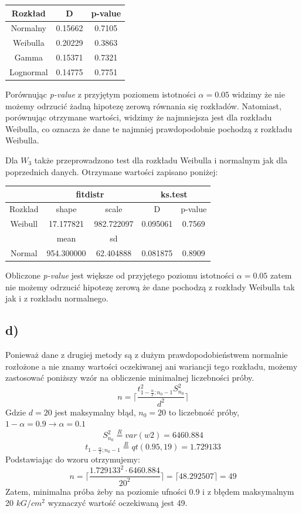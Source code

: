 \documentclass{article}
\begin{document}
\begin{center} \begin{tabular}{|c|c|c|} \hline
Rozkład & D & p-value \\ \hline
Normalny & 0.15662 & 0.7105 \\ \hline
Weibulla & 0.20229 & 0.3863 \\ \hline
Gamma & 0.15371 & 0.7321 \\ \hline
Lognormal & 0.14775 & 0.7751 \\ \hline
\end{tabular} \end{center}
Porównując \textit{p-value} z przyjętym poziomem istotności $\alpha = 0.05$ widzimy że nie możemy odrzucić żadną hipotezę zerową równania się rozkładów. Natomiast, porównując otrzymane wartości, widzimy że najmniejsza jest dla rozkładu Weibulla, co oznacza że dane te najmniej prawdopodobnie pochodzą z rozkładu Weibulla. \\ \par

Dla $W_3$ także przeprowadzono test dla rozkładu Weibulla i normalnym jak dla poprzednich danych. Otrzymane wartości zapisano poniżej:
\begin{center} \begin{tabular}{|c|c|c|c|c|} \hline
& \multicolumn{2}{|c|}{fitdistr} & \multicolumn{2}{|c|}{ks.test} \\ \hline
Rozklad & shape & scale & D & p-value \\ \hline
Weibull & 17.177821 & 982.722097 & 0.095061 & 0.7569 \\ \hline
& mean & sd & & \\ \hline
Normal & 954.300000 & 62.404888 & 0.081875 & 0.8909 \\ \hline
\end{tabular} \end{center}
Obliczone \textit{p-value} jest większe od przyjętego poziomu istotności $\alpha = 0.05$ zatem nie możemy odrzucić hipotezę zerową że dane pochodzą z rozkłady Weibulla tak jak i z rozkładu normalnego.

\subsection{d)}
Ponieważ dane z drugiej metody są z dużym prawdopodobieństwem normalnie rozłożone a nie znamy wartości oczekiwanej ani wariancji tego rozkładu, możemy zastosować poniższy wzór na obliczenie minimalnej liczebności próby.
\[ n = \Big \lceil \frac{t_{1 - \frac{\alpha}{2}; n_0 - 1}^2 S_{n_0}^2}{d^2} \Big \rceil \]
Gdzie $d = 20$ jest maksymalny błąd, $n_0 = 20$ to liczebność próby, $1 - \alpha = 0.9 \rightarrow \alpha = 0.1$
\[ S_{n_0}^2 \overset{R}{=} var(w2) = 6460.884 \]
\[ t_{1 - \frac{\alpha}{2}; n_0 - 1} \overset{R}{=} qt(0.95, 19) = 1.729133 \]
Podstawiając do wzoru otrzymujemy: 
\[ n = \Big \lceil \frac{1.729133^2 \cdot 6460.884}{20^2} \Big \rceil = \lceil 48.292507 \rceil = 49 \]
Zatem, minimalna próba żeby na poziomie ufności 0.9 i z błędem maksymalnym 20 $kG/cm^2$ wyznaczyć wartość oczekiwaną jest 49.
\end{document}
